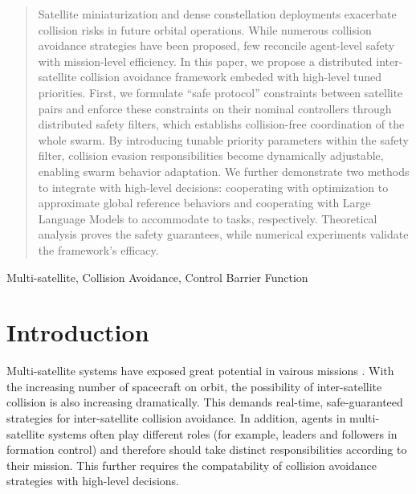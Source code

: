 \documentclass{ifacconf}
\begin{document}
\begin{frontmatter}
\begin{abstract}
   Satellite miniaturization and dense constellation deployments exacerbate collision risks in future orbital operations. 
   While numerous collision avoidance strategies have been proposed, few reconcile agent-level safety with mission-level efficiency.
   In this paper, we propose a distributed inter-satellite collision avoidance framework embeded with high-level tuned priorities.
   First, we formulate ``safe protocol'' constraints between satellite pairs and enforce these constraints on their nominal controllers through distributed safety filters, which establishs collision-free coordination of the whole swarm.
   By introducing tunable priority parameters within the safety filter, collision evasion responsibilities become dynamically adjustable, enabling swarm behavior adaptation. 
   We further demonstrate two methods to integrate with high-level decisions: cooperating with optimization to approximate global reference behaviors and cooperating with Large Language Models to accommodate to tasks, respectively.
   Theoretical analysis proves the safety guarantees, while numerical experiments validate the framework's efficacy.
\end{abstract}

\begin{keyword}
Multi-satellite, Collision Avoidance, Control Barrier Function
\end{keyword}

\end{frontmatter}

\section{Introduction}
\par Multi-satellite systems have exposed great potential in vairous missions \cite[]{Bandyopadhyay2015SmallSatReview}.
With the increasing number of spacecraft on orbit, the possibility of inter-satellite collision is also increasing dramatically. 
This demands real-time, safe-guaranteed strategies for inter-satellite collision avoidance.
In addition, agents in multi-satellite systems often play different roles (for example, leaders and followers in formation control) and therefore should take distinct responsibilities according to their mission.
This further requires the compatability of collision avoidance strategies with high-level decisions.
\end{document}
